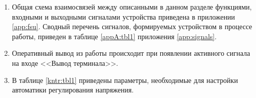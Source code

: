 \begin{enumerate}
\item
Общая схема взаимосвязей между описанными в данном разделе функциями, входными и выходными сигналами устройства приведена в приложении \ref{app:fsu}.
Сводный перечень сигналов, формируемых устройством в процессе работы, приведен в таблице \ref{appA:tbl1} приложения \ref{app:signals}.

\item
Оперативный вывод из работы происходит при появлении активного сигнала на входе <<Вывод терминала>>.


\item
В таблице \ref{kntr:tbl1} приведены параметры, необходимые для настройки автоматики регулирования напряжения.

\end{enumerate}